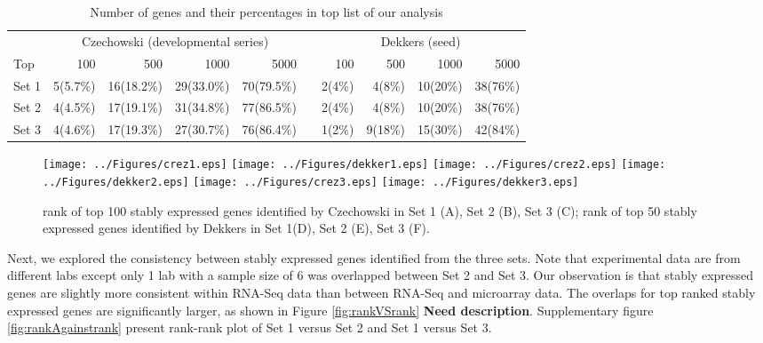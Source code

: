 \documentclass[11pt, a4paper]{article}
\begin{document}
\begin{table}[h]
\caption{Number of genes and their percentages in top list of our analysis}
\label{table:stablegenerank}
\begin{tabular}{lrrrr r rrrr} \hline
 & \multicolumn{4}{c}{Czechowski (developmental series)} & & \multicolumn{4}{c}{Dekkers (seed)} \\ \cmidrule(r){2-10}
Top   &   100  & 500     & 1000     & 5000  &  & 100    & 500    & 1000    & 5000    \\ \hline
Set 1 &  5(5.7\%)   & 16(18.2\%)  & 29(33.0\%)  &70(79.5\%)  & &2(4\%)  &  4(8\%)  &10(20\%) & 38(76\%)   \\
Set 2 & 4(4.5\%)    &17(19.1\%)   & 31(34.8\%)  &77(86.5\%) & &2(4\%)  &  4(8\%)  &10(20\%) & 38(76\%)   \\
Set 3 &4(4.6\%)     &17(19.3\%)   &27(30.7\%)   &76(86.4\%) &  &1(2\%) & 9(18\%) &15(30\%)  & 42(84\%) \\ \hline 
\end{tabular}
\end{table}

 \begin{figure}[h!]
\begin{center}
\texttt{[image: ../Figures/crez1.eps]}
\texttt{[image: ../Figures/dekker1.eps]}
\texttt{[image: ../Figures/crez2.eps]}
\texttt{[image: ../Figures/dekker2.eps]}
\texttt{[image: ../Figures/crez3.eps]}
\texttt{[image: ../Figures/dekker3.eps]}
\caption{\label{stablegenerank} rank of top 100 stably expressed genes identified by Czechowski in Set 1 (A), Set 2 (B), Set 3 (C); rank of top 50 stably expressed genes identified by Dekkers in Set 1(D), Set 2 (E), Set 3 (F).  }
\end{center}
\end{figure}

Next, we explored the consistency between stably expressed genes identified from the three sets. Note that experimental data are from different labs except only 1 lab with a sample size of 6 was overlapped between Set 2 and Set 3. Our observation is that stably expressed genes are slightly more consistent within RNA-Seq data than between RNA-Seq and microarray data.  The overlaps for top ranked stably expressed genes are significantly larger, as shown in Figure \ref{fig:rankVSrank} \textbf{Need description}. Supplementary figure \ref{fig:rankAgainstrank} present rank-rank plot of Set 1 versus Set 2 and Set 1 versus Set 3.  
\end{document}
